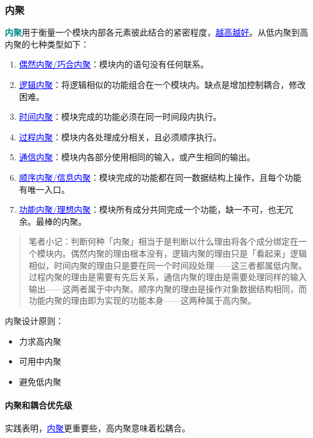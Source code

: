 \documentclass[UTF8]{ctexart}
\newcommand\Concept[1]{\textcolor{darkcyan}{\textbf{#1}}\index{#1}} %
\newcommand\Point[1]{\textcolor{blue}{\uline{#1}}} %
\newenvironment{trivial}[0]{ %
    \begin{quote}\color{gray}\small
}{
    \end{quote}
}
\begin{document}
\subsubsection{内聚}
\Concept{内聚}用于衡量一个模块内部各元素彼此结合的紧密程度，\Point{越高越好}。从低内聚到高内聚的七种类型如下：
\begin{enumerate}
    \item \Point{偶然内聚/巧合内聚}：模块内的语句没有任何联系。
    \item \Point{逻辑内聚}：将逻辑相似的功能组合在一个模块内。缺点是增加控制耦合，修改困难。
    \item \Point{时间内聚}：模块完成的功能必须在同一时间段内执行。
    \item \Point{过程内聚}：模块内各处理成分相关，且必须顺序执行。
    \item \Point{通信内聚}：模块内各部分使用相同的输入，或产生相同的输出。
    \item \Point{顺序内聚/信息内聚}：模块完成的功能都在同一数据结构上操作，且每个功能有唯一入口。
    \item \Point{功能内聚/理想内聚}：模块所有成分共同完成一个功能，缺一不可，也无冗余。最棒的内聚。
\end{enumerate}

\begin{trivial}
    笔者小记：判断何种「内聚」相当于是判断以什么理由将各个成分绑定在一个模块内。偶然内聚的理由根本没有，逻辑内聚的理由只是「看起来」逻辑相似，时间内聚的理由只是要在同一个时间段处理——这三者都属低内聚。过程内聚的理由是需要有先后关系，通信内聚的理由是需要处理同样的输入输出——这两者属于中内聚。顺序内聚的理由是操作对象数据结构相同，而功能内聚的理由即为实现的功能本身——这两种属于高内聚。
\end{trivial}

内聚设计原则：
\begin{itemize}
    \item 力求高内聚
    \item 可用中内聚
    \item 避免低内聚
\end{itemize}

\paragraph{内聚和耦合优先级}
实践表明，\Point{内聚}更重要些，高内聚意味着松耦合。
\end{document}

